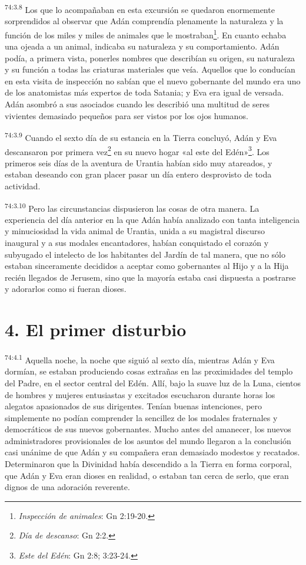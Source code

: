 \par
\textsuperscript{74:3.8} Los que lo acompañaban en esta excursión se quedaron enormemente sorprendidos al observar que Adán comprendía plenamente la naturaleza y la función de los miles y miles de animales que le mostraban\footnote{\textit{Inspección de animales}: Gn 2:19-20.}. En cuanto echaba una ojeada a un animal, indicaba su naturaleza y su comportamiento. Adán podía, a primera vista, ponerles nombres que describían su origen, su naturaleza y su función a todas las criaturas materiales que veía. Aquellos que lo conducían en esta visita de inspección no sabían que el nuevo gobernante del mundo era uno de los anatomistas más expertos de toda Satania; y Eva era igual de versada. Adán asombró a sus asociados cuando les describió una multitud de seres vivientes demasiado pequeños para ser vistos por los ojos humanos.

\par
\textsuperscript{74:3.9} Cuando el sexto día de su estancia en la Tierra concluyó, Adán y Eva descansaron por primera vez\footnote{\textit{Día de descanso}: Gn 2:2.} en su nuevo hogar «al este del Edén»\footnote{\textit{Este del Edén}: Gn 2:8; 3:23-24.}. Los primeros seis días de la aventura de Urantia habían sido muy atareados, y estaban deseando con gran placer pasar un día entero desprovisto de toda actividad.

\par
\textsuperscript{74:3.10} Pero las circunstancias dispusieron las cosas de otra manera. La experiencia del día anterior en la que Adán había analizado con tanta inteligencia y minuciosidad la vida animal de Urantia, unida a su magistral discurso inaugural y a sus modales encantadores, habían conquistado el corazón y subyugado el intelecto de los habitantes del Jardín de tal manera, que no sólo estaban sinceramente decididos a aceptar como gobernantes al Hijo y a la Hija recién llegados de Jerusem, sino que la mayoría estaba casi dispuesta a postrarse y adorarlos como si fueran dioses.

\section*{4. El primer disturbio}
\par
\textsuperscript{74:4.1} Aquella noche, la noche que siguió al sexto día, mientras Adán y Eva dormían, se estaban produciendo cosas extrañas en las proximidades del templo del Padre, en el sector central del Edén. Allí, bajo la suave luz de la Luna, cientos de hombres y mujeres entusiastas y excitados escucharon durante horas los alegatos apasionados de sus dirigentes. Tenían buenas intenciones, pero simplemente no podían comprender la sencillez de los modales fraternales y democráticos de sus nuevos gobernantes. Mucho antes del amanecer, los nuevos administradores provisionales de los asuntos del mundo llegaron a la conclusión casi unánime de que Adán y su compañera eran demasiado modestos y recatados. Determinaron que la Divinidad había descendido a la Tierra en forma corporal, que Adán y Eva eran dioses en realidad, o estaban tan cerca de serlo, que eran dignos de una adoración reverente.

